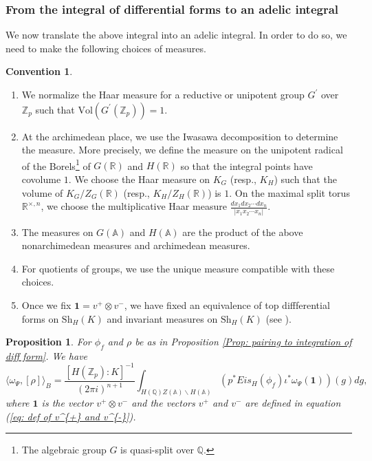 \documentclass[11pt, a4paper]{amsart}
\theoremstyle{plain}
\newtheorem{proposition}[theorem]{Proposition}
\theoremstyle{definition}
\newtheorem{convention}[theorem]{Convention}
\numberwithin{equation}{section}
\def\AAA{\mathbb{A}}
\def\QQ{\mathbb{Q}}
\def\RR{\mathbb{R}}
\def\ZZ{\mathbb{Z}}
\newcommand{\Zp}{\ZZ_p}
\newcommand{\Sh}{\mathrm{Sh}}
\begin{document}
\subsubsection{From the integral of differential forms to an adelic integral}
We now translate the above integral into an adelic integral. In order to do so, we need to make the following choices of measures. 

\begin{convention}
\label{convention: measure}
    \begin{enumerate}
        \item We normalize the Haar measure for a reductive or unipotent group $G^{\prime}$ over $\Zp$ such that $\mathrm{Vol}(G^{\prime}(\Zp)) = 1$. 
        \item At the archimedean place, we use the Iwasawa decomposition to determine the measure. More precisely, we define the measure on the unipotent radical of the Borels\footnote{The algebraic group $G$ is quasi-split over $\QQ$.} of $G(\RR)$  and $H(\RR)$ so that the integral points have covolume $1$. We choose the Haar measure on $K_{G}$ (resp., $K_{H}$) such that the volume of $K_{G} / Z_{G}(\RR)$ (resp., $K_{H} / Z_{H}(\RR)$) is $1$. On the maximal split torus $\RR^{\times, n}$, we choose the multiplicative Haar measure $\frac{dx_1dx_{2} \cdots dx_{n}}{|x_1 x_2 \cdots x_{n}|}$. 
        \item The measures on $G(\AAA)$ and $H(\AAA)$ are the product of the above nonarchimedean measures and archimedean measures. 
        \item For quotients of groups, we use the unique measure compatible with these choices. 
        \item Once we fix $\mathbf{1} = v^{+} \otimes v^{-}$, we have fixed an equivalence of top diffferential forms on $\Sh_{H}(K)$ and invariant measures on $\Sh_{H}(K)$ (see \cite[Page 83]{Harris97}). 
    \end{enumerate}
\end{convention}

\begin{proposition}
\label{Prop: integration of diff form into adelic integral}
For $\phi_f$ and $\rho$ be as in Proposition \ref{Prop: pairing to integration of diff form}. We have 
\begin{equation*}
    \langle \omega_{\Psi}, [\rho] \rangle_{B} =  \frac{[H(\Zp): K]^{-1}}{(2\pi{i})^{n + 1}} \int_{H(\QQ) Z(\AAA) \backslash H(\AAA) } (p^{*} Eis_{H}(\phi_f) \iota^{*} \omega_{\Psi} (\mathbf{1}))(g) dg, 
\end{equation*}
where $\mathbf{1}$ is the vector $v^{+} \otimes v^{-}$ and the vectors $v^{+}$ and $v^{-}$ are defined in equation (\ref{eq: def of v^{+} and v^{-}}).
\end{proposition}
\end{document}
